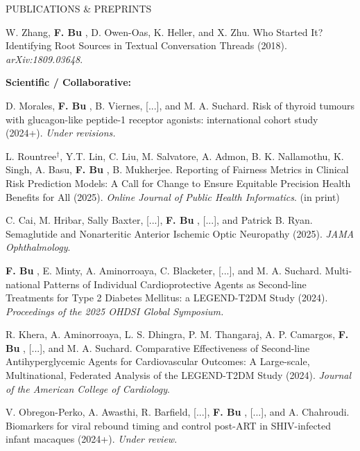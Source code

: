 \documentclass{resume} %
\newcommand{\thisYear}[1]{
	#1
}
\newcommand{\myName}[1]{
	\textbf{#1}
}
\begin{document}
\begin{rSection}{PUBLICATIONS \& PREPRINTS}
\smallskip

W. Zhang, \myName{F. Bu}, D. Owen-Oas, K. Heller, and X. Zhu. 
Who Started It? Identifying Root Sources in Textual Conversation Threads (2018). \emph{arXiv:1809.03648}.

\medskip

\hspace{-.2in} \textbf{Scientific / Collaborative:}

D. Morales, \myName{F. Bu}, B. Viernes, [...], and M. A. Suchard. Risk of thyroid tumours with glucagon-like peptide-1 receptor agonists: international cohort study (2024+). \emph{Under revisions.} 

\smallskip 

\thisYear{
L. Rountree$^\dagger$, Y.T.  Lin, C. Liu, M. Salvatore, A.  Admon, B. K. Nallamothu, K. Singh, A. Basu, \myName{F. Bu}, B. Mukherjee. Reporting of Fairness Metrics in Clinical Risk Prediction Models: A Call for Change to Ensure Equitable Precision Health Benefits for All (2025). \emph{Online Journal of Public Health Informatics}. (in print)
}

\smallskip 

\thisYear{
C. Cai, M. Hribar, Sally Baxter, [...],  \myName{F. Bu}, [...], and Patrick B. Ryan. 
Semaglutide and Nonarteritic Anterior Ischemic Optic Neuropathy (2025). \emph{JAMA Ophthalmology}.  
}

\smallskip

\thisYear{
\myName{F. Bu}, E. Minty, A. Aminorroaya, C. Blacketer, [...], and M. A. Suchard. 
Multi-national Patterns of Individual Cardioprotective Agents as Second-line Treatments for Type 2 Diabetes Mellitus: a LEGEND-T2DM Study (2024). \emph{Proceedings of the 2025 OHDSI Global Symposium.}
}

\thisYear{
R. Khera, A. Aminorroaya, L. S. Dhingra, P. M.  Thangaraj, A. P. Camargos, \myName{F. Bu}, [...], and M. A. Suchard. Comparative Effectiveness of Second-line Antihyperglycemic Agents for Cardiovascular Outcomes: A Large-scale, Multinational, Federated Analysis of the LEGEND-T2DM Study (2024). \emph{Journal of the American College of Cardiology}. 
}

\smallskip 

V. Obregon-Perko, A. Awasthi, R. Barfield, [...], \myName{F. Bu}, [...], and A. Chahroudi. Biomarkers for viral rebound timing and control post-ART in SHIV-infected infant macaques (2024+). \emph{Under review}.

\smallskip 


\end{rSection}
\end{document}
